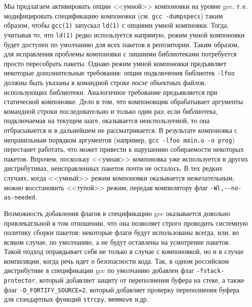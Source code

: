 \documentclass[russian,a4paper,12pt,titlepage]{article}
\begin{document}
Мы предлагаем активировать опции <<умной>> компоновки на уровне gcc, т.\,е. модифицировать спецификацию компоновки
(см. \texttt{gcc -dumpspecs}) таким образом, чтобы \verb|gcc(1)| запускал \verb|ld(1)| с опциями умной компновки.  Тогда, учитывая то,
что \verb|ld(1)| редко используется напрямую, режим умной компоновки будет доступен по умолчанию для всех пакетов в репозитории.
Таким образом, для исправления проблемы компоновки с лишними библиотеками потребуется просто пересобрать пакеты.  Однако режим
умной компоновки предъявляет некоторые дополнительные требования: опции подключения библиотек \verb|-lfoo| должны быть указаны
в командной строке \emph{после} объектных файлов, использующих библиотеки.  Аналогичное требование предьявляется при статической компоновке.
Дело в том, что компоновщик обрабатывает аргументы командной строки последовательно и только один раз; если библиотека, подключаемая
на текущем шаге, оказывается неиспользуемой, то она отбрасывается и в дальнейшем не рассматривается.  В результате компоновка
с неправильным порядком аргументов (например, \texttt{gcc -lfoo main.o -o prog}) перестанет работать, что может привести
к нарушению собираемости некоторых пакетов.  Впрочем, поскольку <<умная>> компоновка уже используется в других дистрибутивах,
неисправленных пакетов почти не осталось.  В тех редких случаях, когда <<умный>> режим компоновки оказывается нежелательным,
можно восстановить <<тупой>> режим, передав компилятору флаг \verb|-Wl,--no-as-needed|.

Возможность добавления флагов в спецификацию gcc оказывается довольно привлекатльной в том отношении, что она позволяет
строго проводить системную политику сборки пакетов: некоторые флаги будут использованы всегда, или, во всяком случае,
по умолчанию, а не будут оставлены на усмотрение пакетов.  Такой подход оправдывает себя не только в случае с компоновкой,
но и в случае компиляции, когда речь идет о безопасности кода.  Так, в одном российском дистрибутиве в спецификации gcc
по умолчанию добавлен флаг \verb|-fstack-protector|, который добавляет защиту от переполнения буфера на стеке,
а также флаг \verb|-D_FORTIFY_SOURCE=2|, который добавляет проверку переполнения буфера для стандартных функций \verb|strcpy|,
\verb|memmove| и\,др.
\end{document}
